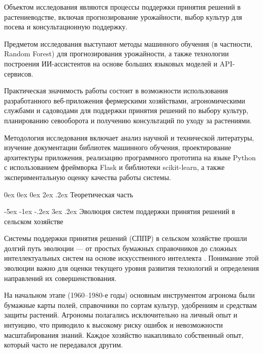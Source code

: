 \documentclass[14pt, a4paper]{extarticle}
\makeatletter
\renewcommand\section{\@startsection {section}{1}{\z@}%
    {0ex \@plus 0ex \@minus 0ex}%
    {2ex \@plus.2ex}%
    {\centering\normalfont\Large\bfseries}}
\renewcommand\subsection{\@startsection {subsection}{2}{\z@}%
    {-5ex \@plus -1ex \@minus -.2ex}%
    {3ex \@plus.2ex}%
    {\centering\large\bfseries}}
\makeatother
\begin{document}
    Объектом исследования являются процессы поддержки принятия решений в растениеводстве, включая прогнозирование урожайности, выбор культур для посева и консультационную поддержку.

    Предметом исследования выступают методы машинного обучения (в частности, Random Forest) для прогнозирования урожайности, а также технологии построения ИИ-ассистентов на основе больших языковых моделей и API-сервисов.

    Практическая значимость работы состоит в возможности использования разработанного веб-приложения фермерскими хозяйствами, агрономическими службами и садоводами для поддержки принятия решений по выбору культур, планированию севооборота и получению консультаций по уходу за растениями.

    Методология исследования включает анализ научной и технической литературы, изучение документации библиотек машинного обучения, проектирование архитектуры приложения, реализацию программного прототипа на языке Python с использованием фреймворка Flask и библиотеки scikit-learn, а также экспериментальную оценку качества работы системы.


\newpage
\section{Теоретическая часть}

\subsection{Эволюция систем поддержки принятия решений в сельском хозяйстве}

    Системы поддержки принятия решений (СППР) в сельском хозяйстве прошли долгий путь эволюции — от простых бумажных справочников до сложных интеллектуальных систем на основе искусственного интеллекта \cite{evolution}. Понимание этой эволюции важно для оценки текущего уровня развития технологий и определения направлений их совершенствования.

    На начальном этапе (1960–1980-е годы) основным инструментом агронома были бумажные карты полей, справочники по сортам культур, удобрениям и средствам защиты растений. Агрономы полагались исключительно на личный опыт и интуицию, что приводило к высокому риску ошибок и невозможности масштабирования знаний. Каждое хозяйство накапливало собственный опыт, который часто не передавался другим.
\end{document}
